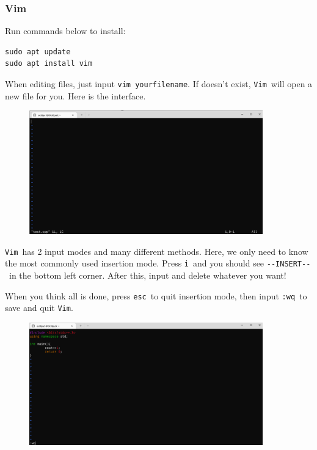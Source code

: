 \documentclass[12pt]{ctexart}
\begin{document}
\subsubsection{\textbf{Vim}}

Run commands below to install:

\begin{adjustwidth}{2em}{0pt}
\begin{verbatim}
sudo apt update
sudo apt install vim
\end{verbatim}
\end{adjustwidth}

When editing files, just input \texttt{vim\ yourfilename}. If
doesn't exist, \texttt{Vim}\ will open a new file for
you. Here is the interface.

\begin{figure}[H]
    \centering
    \includegraphics[width=0.9\textwidth,keepaspectratio]{assets/Linux/1.3 How to edit files on Linux/2.png}
\end{figure}

\texttt{Vim}\ has 2 input modes and many different methods. Here, we only
need to know the most commonly used insertion mode. Press \texttt{i}\ and
you should see \texttt{-\/-INSERT-\/-}\ in the bottom left corner. After
this, input and delete whatever you want!

When you think all is done, press \texttt{esc}\ to quit insertion mode,
then input \texttt{:wq}\ to save and quit \texttt{Vim}.

\begin{figure}[H]
    \centering
    \includegraphics[width=0.9\textwidth,keepaspectratio]{assets/Linux/1.3 How to edit files on Linux/3.png}
\end{figure}
\end{document}
